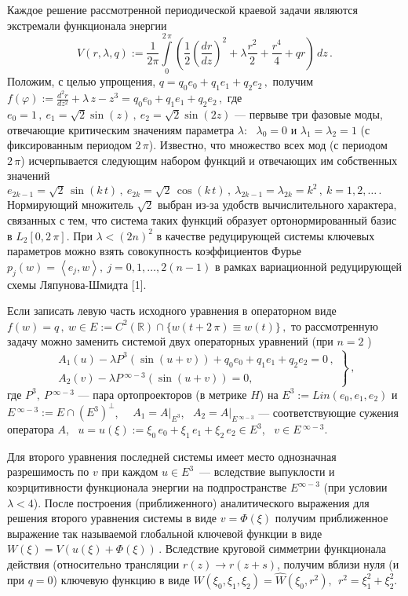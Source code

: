 Каждое решение рассмотренной периодической краевой задачи являются
экстремали функционала энергии
 $$
V (r, \lambda, q):= \frac1{2\pi}\int\limits_0^{2\,\pi}
\left(\frac12\left(\frac{dr}{dz}\right)^2  +   \lambda  \frac{r^2}2
+ \frac{r^4}4 + qr\right)\,dz\,.
 $$
Положим, с целью упрощения,  $q = q_0e_0 + q_1e_1 + q_2e_2\,,$
получим
 $
f(\varphi):=\frac{d^2 r}{dz^2} + \lambda\,z - z^3 = q_0e_0 + q_1e_1
+ q_2e_2\,,
 $
где $ e_0 = 1\,, \  e_1=\sqrt {2}\sin(z)\,, \  e_2=\sqrt
{2}\sin(2z)$
--- первыве три фазовые моды, отвечающие критическим значениям
параметра $\lambda$: \ $\lambda_0=0$  и $\lambda_1=\lambda_2=1$ (с
фиксированным периодом $2\,\pi$). Известно, что множество всех мод
(с периодом $2\,\pi$) исчерпывается следующим набором функций и
отвечающих им собственных значений
 $
e_{2k-1} = \sqrt2\,\sin(k\,t)\,,  \ e_{2k} = \sqrt2\,\operatorname{cos}(k\,t)\,, \
\lambda_{2k-1} = \lambda_{2k} = k^2\,, \ k=1,2,\dots \,.
 $
Нормирующий множитель $\sqrt2$ выбран из-за удобств вычислительного
характера, связанных с тем, что система таких функций образует
ортонормированный базис в $L_2[0,2\,\pi]$. При $\lambda<(2n)^2$ в
качестве редуцирующей системы ключевых параметров можно взять
совокупность коэффициентов Фурье
 $
p_j(w)=\left<e_j,w\right>,\ j=0,1,\ldots,2(n-1)
 $
в рамках вариационной редуцирующей схемы Ляпунова-Шмидта [1].

Если записать левую часть исходного уравнения в операторном виде
 $
f (w) =q\,, \  w\in E:=C^2(\mathbb{R})\cap\{w(t+2\,\pi)\equiv
w(t)\}\,,
 $
то рассмотренную задачу можно заменить системой двух операторных
уравнений (при $n=2$ )
 $$
 \left.
\begin{array}{l}
A_1 \left( u \right) - \lambda P^3 \left(\sin( u+v) \right)
+q_0e_0+q_1e_1+q_2e_2 = 0\,,
\\
A_2( v ) - \lambda P\,^{\infty-3}
 \left( \sin(u+v)\right) =0,
\end{array}\right\}\,,
  $$
где $P^3,\ P\,^{\infty-3}$ --- пара ортопроекторов (в метрике $H$)
на $E^3:=Lin(e_0,e_1,e_2)$ и
$E\,^{\infty-3}:=E\cap\left(E^3\right)^\perp$, \ \ $A_1 =
A\vert_{E^3}$, \ $A_2 = A\vert_{E\,^{\infty-3}}$ --- соответствующие
сужения оператора $A$, \ $u = u(\xi):=\xi_0\,e_0 + \xi_1\,e_1 +
\xi_2\,e_2 \in E^3$, \ $v\in E\,^{\infty-3}$.

Для второго уравнения последней системы имеет место однозначная
разре\-ши\-мость по $v$ при каждом $u\in E^3$~--- всле\-д\-с\-т\-вие
выпуклости и коэрцитивности функционала энергии на подпространстве
$E^{\infty-3}$ (при условии $\lambda<4$). После построения
(приближенного) аналитического выражения для решения второго
уравнения системы  в виде $v=\Phi(\xi)$ получим приближенное
выражение так называемой глобальной ключевой функции в виде
 $
W(\xi)=V\left(u(\xi)+\Phi(\xi)\right)\,.
 $
Вследствие круговой симметрии функционала действия (относительно
трансляции  $r(z) \longrightarrow r(z+s)$, получим вблизи нуля (и при
$ q=0$) ключевую функцию в виде
 $
W(\xi_0,\xi_1,\xi_2) = \widehat{W}(\xi_0,r^2), \ \
r^2=\xi_1^2+\xi_2^2.
 $


